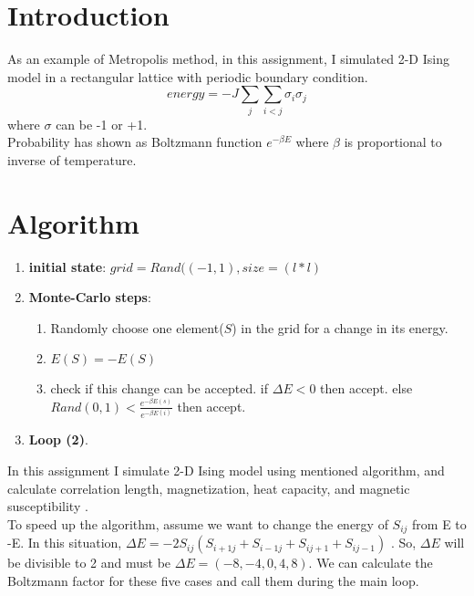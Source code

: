 \documentclass{article}
\begin{document}
\section{Introduction}
As an example of Metropolis method, in this assignment, I simulated 2-D Ising model in a rectangular lattice with periodic boundary condition.
\begin{equation}
 energy = - J \sum _j \sum _{i<j} \sigma_i \sigma_j 
\end{equation}
where $\sigma$ can be -1 or +1.\\
Probability has shown as Boltzmann function $e^{-\beta E}$ where $\beta$ is proportional to inverse of temperature.
\section{Algorithm}
\begin{enumerate}
    \item \textbf{initial state}:\newline
    $grid = Rand((-1, 1), size = ( l * l)$
    \item \textbf{Monte-Carlo steps}:\newline
     \begin{enumerate}
      \item Randomly choose one element($S$) in the grid for a change in its energy.
      \item $E(S) = -E(S)$
      \item check if this change can be accepted.\newline
      if $\Delta E<0$ then accept.\newline
      else $Rand(0,1) < \frac{e^{-\beta E(s)}}{e^{-\beta E(i)}}$ then accept.
\end{enumerate}
    \item \textbf{Loop (2)}.
\end{enumerate}
In this assignment I simulate 2-D Ising model using mentioned algorithm, and calculate correlation length, magnetization, heat capacity, and magnetic susceptibility .\\
To speed up the algorithm, assume we want to change the energy of $S_{ij}$ from E to -E. In this situation, $\Delta E = -2S_{ij}(S_{i+1j}+S_{i-1j}+S_{ij+1}+S_{ij-1})$ . So, $\Delta E $ will be divisible to 2 and must be $\Delta E = (-8,-4,0,4,8)$. We can calculate the Boltzmann factor for these five cases and call them during the main loop.
\end{document}
